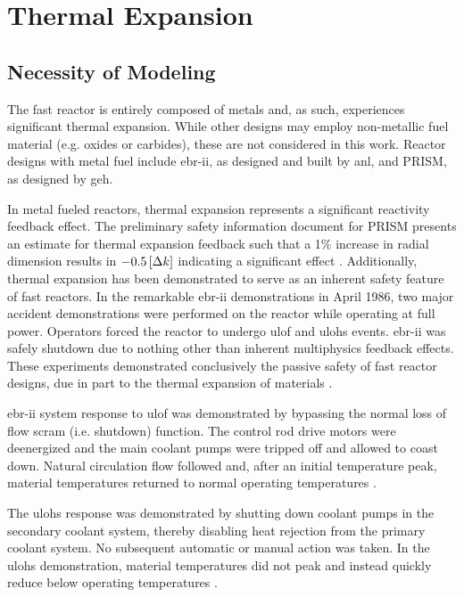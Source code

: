 \chapter{Thermal Expansion}
\label{ch:thermalExpansion}

\section{Necessity of Modeling}
  The fast reactor is entirely composed of metals and, as such,
  experiences significant thermal expansion. While other designs may employ
  non-metallic fuel material (e.g. oxides or carbides), these are not considered
  in this work. Reactor designs with metal fuel include \gls{ebr-ii}, as
  designed and built by \gls{anl}, and PRISM, as designed by \gls{geh}.

  In metal fueled reactors, thermal expansion represents a significant
  reactivity feedback effect.  The preliminary safety information document for
  PRISM presents an estimate for thermal expansion feedback such that a 1\%
  increase in radial dimension results in $-0.5 \left[\text{{$\Delta k$}}\right]$ indicating a
  significant effect \cite{GEFR793}. Additionally, thermal expansion has been
  demonstrated to serve as an inherent safety feature of fast reactors. In the
  remarkable \gls{ebr-ii} demonstrations in April 1986, two major accident
  demonstrations were performed on the reactor while operating at full power.
  Operators forced the reactor to undergo \gls{ulof} and \gls{ulohs} events.
  \gls{ebr-ii} was safely shutdown due to nothing other than inherent
  multiphysics feedback effects. These experiments demonstrated conclusively the
  passive safety of fast reactor designs, due in part to the thermal expansion
  of materials \cite{PlentifulEnergy}.

  \gls{ebr-ii} system response to \gls{ulof} was demonstrated by bypassing the
  normal loss of flow scram (i.e. shutdown) function. The control rod drive
  motors were deenergized and the main coolant pumps were tripped off and
  allowed to coast down. Natural circulation flow followed and, after an initial
  temperature peak, material temperatures returned to normal operating
  temperatures \cite{ebriitests}. 
  
  The \gls{ulohs} response was demonstrated by
  shutting down coolant pumps in the secondary coolant system, thereby disabling
  heat rejection from the primary coolant system. No subsequent automatic or
  manual action was taken. In the \gls{ulohs} demonstration, material
  temperatures did not peak and instead quickly reduce below operating
  temperatures \cite{ebriitests}.

